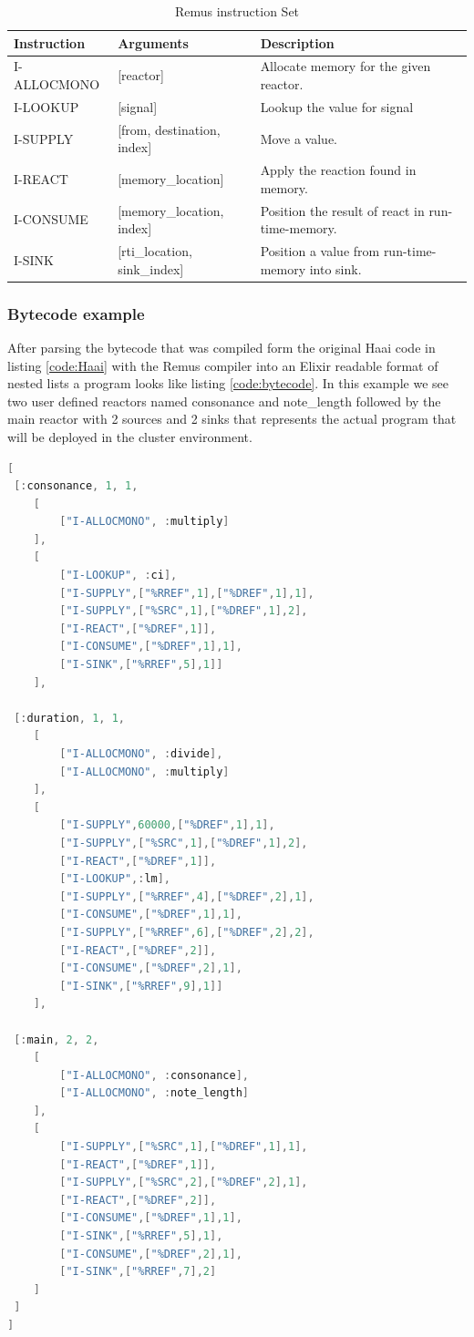 \documentclass[a4paper]{book}
\begin{document}
\begin{table}[h!]
	\centering
	\begin{tabular}{@{}lll@{}}
		\toprule
		\textbf{Instruction} & \textbf{Arguments} & \textbf{Description} \\ \midrule
		I-ALLOCMONO & [reactor]  & Allocate memory for the given reactor. \\
		I-LOOKUP & [signal]  & Lookup the value for signal \\
		I-SUPPLY & [from, destination, index] &  Move a value.\\
		I-REACT  &[memory\_location] & Apply the reaction found in memory. \\
		I-CONSUME & [memory\_location, index] & Position the result of react in run-time-memory. \\
		I-SINK & [rti\_location, sink\_index]& Position a value from run-time-memory into sink. \\ 
		\toprule
	\end{tabular}
	\caption{Remus instruction Set}
	\label{tab:instructionset}
\end{table}

\subsubsection*{Bytecode example}

After parsing the bytecode that was compiled form the original Haai code in listing \ref{code:Haai} with the Remus compiler into an Elixir readable format of nested lists a program looks like listing \ref{code:bytecode}. In this example we see two user defined reactors named consonance and note\_length followed by the main reactor with 2 sources and 2 sinks that represents the actual program that will be deployed in the cluster environment.

\begin{lstlisting}[language=C, caption={Remus bytecode as Elixir nested lists},captionpos=b, label={code:bytecode}, basicstyle=\ttfamily, frame=single]
[
 [:consonance, 1, 1,
	[
		["I-ALLOCMONO", :multiply]
	],
	[
		["I-LOOKUP", :ci],
		["I-SUPPLY",["%RREF",1],["%DREF",1],1],
		["I-SUPPLY",["%SRC",1],["%DREF",1],2],
		["I-REACT",["%DREF",1]],
		["I-CONSUME",["%DREF",1],1],
		["I-SINK",["%RREF",5],1]]
	],

 [:duration, 1, 1,
	[
		["I-ALLOCMONO", :divide],
		["I-ALLOCMONO", :multiply]
	],
	[
		["I-SUPPLY",60000,["%DREF",1],1],
		["I-SUPPLY",["%SRC",1],["%DREF",1],2],
		["I-REACT",["%DREF",1]],
		["I-LOOKUP",:lm],
		["I-SUPPLY",["%RREF",4],["%DREF",2],1],
		["I-CONSUME",["%DREF",1],1],
		["I-SUPPLY",["%RREF",6],["%DREF",2],2],
		["I-REACT",["%DREF",2]],
		["I-CONSUME",["%DREF",2],1],
		["I-SINK",["%RREF",9],1]]
	],

 [:main, 2, 2,
	[
		["I-ALLOCMONO", :consonance],
		["I-ALLOCMONO", :note_length]
	],
	[
		["I-SUPPLY",["%SRC",1],["%DREF",1],1],
		["I-REACT",["%DREF",1]],
		["I-SUPPLY",["%SRC",2],["%DREF",2],1],
		["I-REACT",["%DREF",2]],
		["I-CONSUME",["%DREF",1],1],
		["I-SINK",["%RREF",5],1],
		["I-CONSUME",["%DREF",2],1],
		["I-SINK",["%RREF",7],2]
	]
 ]
]
\end{lstlisting}
\end{document}
